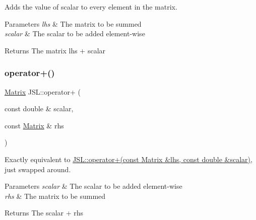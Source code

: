 Adds the value of scalar to every element in the matrix. 


\begin{DoxyParams}{Parameters}
{\em lhs} & The matrix to be summed \\
\hline
{\em scalar} & The scalar to be added element-\/wise \\
\hline
\end{DoxyParams}
\begin{DoxyReturn}{Returns}
The matrix lhs + scalar 
\end{DoxyReturn}
\mbox{\label{namespaceJSL_a5f6c1988cf84b088617e0f12fc1e98da}} 
\subsubsection{\texorpdfstring{operator+()}{operator+()}\hspace{0.1cm}{\footnotesize\ttfamily [6/6]}}
{\footnotesize\ttfamily \hyperlink{classJSL_1_1Matrix}{Matrix} J\+S\+L\+::operator+ (\begin{DoxyParamCaption}\item[{const double \&}]{scalar,  }\item[{const \hyperlink{classJSL_1_1Matrix}{Matrix} \&}]{rhs }\end{DoxyParamCaption})\hspace{0.3cm}{\ttfamily [inline]}}



Exactly equivalent to \hyperlink{namespaceJSL_ad779a68a2d565490f76dd16adfc3091e}{J\+S\+L\+::operator+(const Matrix \&lhs, const double \&scalar)}, just swapped around. 


\begin{DoxyParams}{Parameters}
{\em scalar} & The scalar to be added element-\/wise \\
\hline
{\em rhs} & The matrix to be summed \\
\hline
\end{DoxyParams}
\begin{DoxyReturn}{Returns}
The scalar + rhs 
\end{DoxyReturn}
\mbox{\label{namespaceJSL_a1d8393f2865dc23e7975ad041e341ba5}} 
